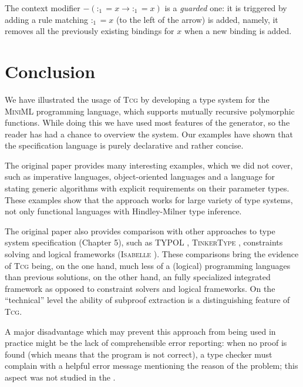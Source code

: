 \documentclass[a4paper,12pt]{article}
\newcommand{\Tcg}{\textsc{Tcg}}
\begin{document}
The context modifier $-(:_1 = x \rightarrow :_1 = x)$ is a \emph{guarded} one: it is triggered by adding a rule matching $:_1 = x$ (to the left of the arrow) is added, namely, it removes all the previously existing bindings for $x$ when a new binding is added.

\section{Conclusion}

We have illustrated the usage of \Tcg{} by developing a type system for the \textsc{MiniML} programming language, which supports mutually recursive polymorphic functions. While doing this we have used most features of the generator, so the reader has had a chance to overview the system. Our examples have shown that the specification language is purely declarative and rather concise.

The original paper \cite{Tcg} provides many interesting examples, which we did not cover, such as imperative languages, object-oriented languages and a language for stating generic algorithms with explicit requirements on their parameter types. These examples show that the approach works for large variety of type systems, not only functional languages with Hindley-Milner type inference. 

The original paper also provides comparison with other approaches to type system specification (Chapter 5), such as TYPOL \cite{Typol}, \textsc{TinkerType} \cite{Tinker}, constraints solving and logical frameworks (\textsc{Isabelle} \cite{Isabelle}). These comparisons bring the evidence of \Tcg{} being, on the one hand, much less of a (logical) programming languages than previous solutions, on the other hand,  an fully specialized integrated framework as opposed to constraint solvers and logical frameworks. On the ``technical'' level the ability of subproof extraction is a distinguishing feature of \Tcg{}.

A major disadvantage which may prevent this approach from being used in practice might be the lack of comprehensible error reporting: when no proof is found (which means that the program is not correct), a type checker must complain with a helpful error message mentioning the reason of the problem; this aspect was not studied in the \cite{Tcg}.
\end{document}
